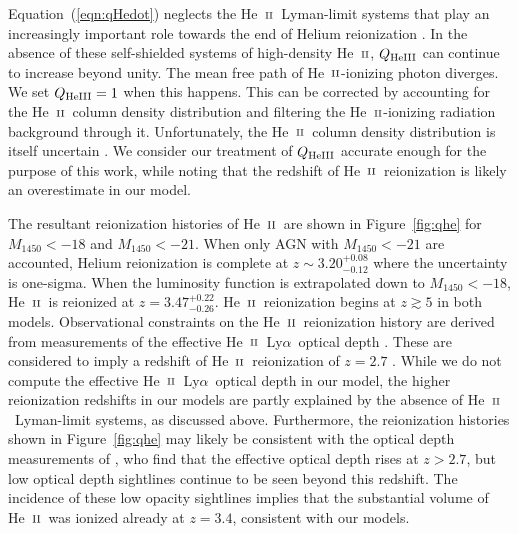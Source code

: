\documentclass[fleqn,usenatbib]{mnras}
\def\lya{Ly$\alpha$~}
\def\nHeIII{{\rm HeIII}}
\def\HeII{\hbox{He~$\scriptstyle\rm II$}}
\begin{document}
      Equation~(\ref{eqn:qHedot}) neglects the \HeII\ Lyman-limit systems
      that play an increasingly important role towards the end of Helium
      reionization \citep{2009MNRAS.395..736B, 2017ApJ...851...50M}.  In the
      absence of these self-shielded systems of high-density \HeII,
      $Q_\nHeIII$ can continue to increase beyond unity.  The mean free path
      of \HeII-ionizing photon diverges.  We set $Q_\nHeIII=1$ when this
      happens.  This can be corrected by accounting for the \HeII\ column
      density distribution and filtering the \HeII-ionizing radiation
      background through it.  Unfortunately, the \HeII\ column density
      distribution is itself uncertain \citep{2018arXiv180104931P}.  We
      consider our treatment of $Q_\nHeIII$ accurate enough for the purpose
      of this work, while noting that the redshift of \HeII\ reionization is
      likely an overestimate in our model.

      The resultant reionization histories of \HeII\ are shown in
      Figure~\ref{fig:qhe} for $M_\mathrm{1450}<-18$ and
      $M_\mathrm{1450}<-21$.  When only AGN with $M_\mathrm{1450}<-21$ are
      accounted, Helium reionization is complete at $z\sim
      3.20^{+0.08}_{-0.12}$ where the uncertainty is one-sigma.  When the
      luminosity function is extrapolated down to $M_\mathrm{1450}<-18$,
      \HeII\ is reionized at $z=3.47^{+0.22}_{-0.26}$.  \HeII\ reionization
      begins at $z\gtrsim 5$ in both models.  Observational constraints on
      the \HeII\ reionization history are derived from measurements of the
      effective \HeII\ \lya optical depth \citep{2001Sci...293.1112K,
        2004ApJ...600..570S, 2006A&A...455...91F, 2010ApJ...722.1312S,
        2011ApJ...733L..24W, 2016ApJ...825..144W}.  These are considered to
      imply a redshift of \HeII\ reionization of $z=2.7$
      \citep{2011ApJ...733L..24W}.  While we do not compute the effective
      \HeII\ \lya optical depth in our model, the higher reionization
      redshifts in our models are partly explained by the absence of
      \HeII\ Lyman-limit systems, as discussed above.  Furthermore, the
      reionization histories shown in Figure~\ref{fig:qhe} may likely be
      consistent with the optical depth measurements of
      \citet{2016ApJ...825..144W}, who find that the effective optical depth
      rises at $z>2.7$, but low optical depth sightlines continue to be seen
      beyond this redshift.  The incidence of these low opacity sightlines
      implies that the substantial volume of \HeII\ was ionized already at
      $z=3.4$, consistent with our models.
\end{document}
